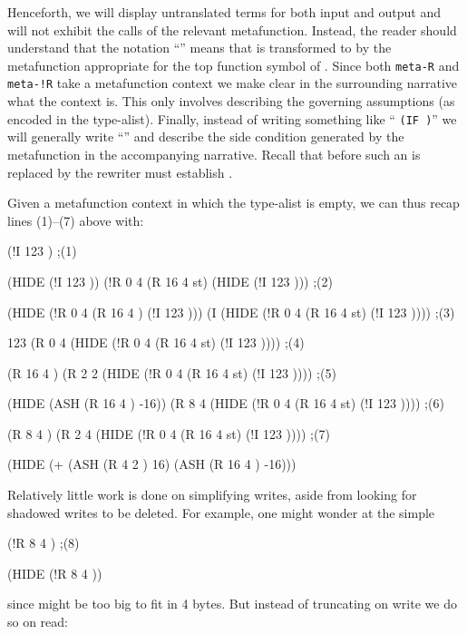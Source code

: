 \documentclass[submission,copyright,creativecommons]{eptcs}
\newcommand{\ptt}[1]{\tt{#1}}
\begin{document}
Henceforth, we will display untranslated terms for both input and output and will not
exhibit the calls of the relevant metafunction.  Instead, the reader should
understand that the notation ``''
means that  is transformed to  by the metafunction appropriate
for the top function symbol of .  Since both {\ptt{meta-R}} and
{\ptt{meta-!R}} take a metafunction context we make clear in the surrounding
narrative what the context is.  This only involves describing the governing
assumptions (as encoded in the type-alist).  Finally, instead of writing
something like `` {\ptt{(IF  
    )}}'' we will generally write ``'' and describe the side condition
 generated by the metafunction in the accompanying narrative.  Recall
that before such an  is replaced by  the rewriter must
establish .

Given a metafunction context in which the type-alist is empty, we can
thus recap lines {\rm{(1)}}--{\rm{(7)}} above with:
\begin{acl2p}
(!I 123 )                                                            ;{\rm{(1)}}

(HIDE (!I 123 ))
\vspace*{0.0em}
(!R 0 4 (R 16 4 st) (HIDE (!I 123 )))                                ;{\rm{(2)}}

(HIDE (!R 0 4 (R 16 4 ) (!I 123 )))
\vspace*{0.0em}
(I (HIDE (!R 0 4 (R 16 4 st)  (!I 123 ))))                           ;{\rm{(3)}}

123
\vspace*{0.0em}
(R 0 4 (HIDE (!R 0 4 (R 16 4 st) (!I 123 ))))                        ;{\rm{(4)}}

(R 16 4 )
\vspace*{0.0em}
(R 2 2 (HIDE (!R 0 4 (R 16 4 st) (!I 123 ))))                        ;{\rm{(5)}}

(HIDE (ASH (R 16 4 ) -16))
\vspace*{0.0em}
(R 8 4 (HIDE (!R 0 4 (R 16 4 st) (!I 123 ))))                        ;{\rm{(6)}}

(R 8 4 )
\vspace*{0.0em}
(R 2 4 (HIDE (!R 0 4 (R 16 4 st) (!I 123 ))))                        ;{\rm{(7)}}

(HIDE (+ (ASH (R 4 2 ) 16)
         (ASH (R 16 4 ) -16)))
\end{acl2p}

Relatively little work is done on simplifying writes, aside from looking for
shadowed writes to be deleted.  For example, one might wonder at the simple
\begin{acl2p}
(!R 8 4  )                                                          ;{\rm{(8)}}

(HIDE (!R 8 4  ))
\end{acl2p}
{\noindent}since  might be too big to fit in 4 bytes.  But instead of truncating  on
write we do so on read:
\end{document}
